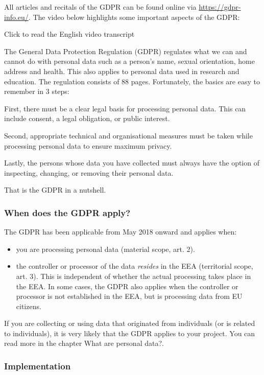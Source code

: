 \documentclass[
]{book}
\providecommand{\tightlist}{%
  \setlength{\itemsep}{0pt}\setlength{\parskip}{0pt}}
\begin{document}
All articles and recitals of the GDPR can be found online via \url{https://gdpr-info.eu/}.
The video below highlights some important aspects of the GDPR:

Click to read the English video transcript

The General Data Protection Regulation (GDPR) regulates what we can
and cannot do with personal data such as a person's name, sexual orientation,
home address and health. This also applies to personal data used in research
and education. The regulation consists of 88 pages. Fortunately, the basics
are easy to remember in 3 steps:

First, there must be a clear legal basis for processing personal data. This can
include consent, a legal obligation, or public interest.

Second, appropriate technical and organisational measures must be taken
while processing personal data to ensure maximum privacy.

Lastly, the persons whose data you have collected must always have the
option of inspecting, changing, or removing their personal data.

That is the GDPR in a nutshell.

\hypertarget{gdpr-scope}{%
\subsubsection{When does the GDPR apply?}\label{gdpr-scope}}

The GDPR has been applicable from May 2018 onward and applies when:

\begin{itemize}
\tightlist
\item
  you are processing personal data
  (material scope, art. 2).
\item
  the controller or processor of the data \emph{resides} in the EEA (territorial
  scope, art. 3).
  This is independent of whether the actual processing takes place in the EEA.
  In some cases, the GDPR also applies when the controller or processor is not
  established in the EEA, but is processing data from EU citizens.
\end{itemize}

If you are collecting or using data that originated from individuals (or is
related to individuals), it is very likely that the GDPR applies to your project.
You can read more in the chapter What are personal data?.

\hypertarget{implementation}{%
\subsubsection{Implementation}\label{implementation}}
\end{document}
